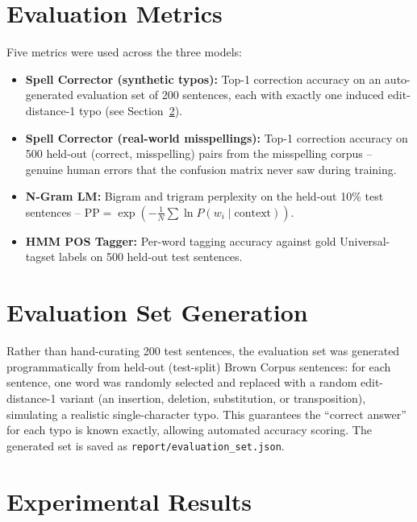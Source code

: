 \documentclass[12pt,a4paper]{report}
\begin{document}
\section{Evaluation Metrics}

Five metrics were used across the three models:
\begin{itemize}
    \item \textbf{Spell Corrector (synthetic typos):} Top-1 correction
    accuracy on an auto-generated evaluation set of 200 sentences, each
    with exactly one induced edit-distance-1 typo (see
    Section~\ref{sec:evalset}).
    \item \textbf{Spell Corrector (real-world misspellings):} Top-1
    correction accuracy on 500 held-out (correct, misspelling) pairs
    from the misspelling corpus -- genuine human errors that the
    confusion matrix never saw during training.
    \item \textbf{N-Gram LM:} Bigram and trigram perplexity on the
    held-out 10\% test sentences --
    $\mathrm{PP} = \exp\!\left(-\frac{1}{N}\sum \ln P(w_i\mid \text{context})\right)$.
    \item \textbf{HMM POS Tagger:} Per-word tagging accuracy against gold
    Universal-tagset labels on 500 held-out test sentences.
\end{itemize}

\section{Evaluation Set Generation}
\label{sec:evalset}

Rather than hand-curating 200 test sentences, the evaluation set was
generated programmatically from held-out (test-split) Brown Corpus
sentences: for each sentence, one word was randomly selected and replaced
with a random edit-distance-1 variant (an insertion, deletion,
substitution, or transposition), simulating a realistic single-character
typo. This guarantees the ``correct answer'' for each typo is known
exactly, allowing automated accuracy scoring. The generated set is saved
as \texttt{report/evaluation\_set.json}.

\section{Experimental Results}
\end{document}
